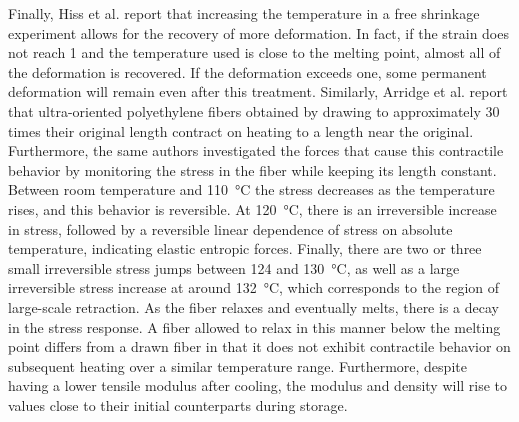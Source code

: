 Finally, Hiss et al. \citep{hissNetworkStretchingSlip1999} report that increasing the temperature in a free shrinkage experiment allows for the recovery of more deformation.
In fact, if the strain does not reach 1 and the temperature used is close to the melting point, almost all of the deformation is recovered.
If the deformation exceeds one, some permanent deformation will remain even after this treatment.
Similarly, Arridge et al. \citep{arridgeSelfhardeningHighlyOriented1977} report that ultra-oriented polyethylene fibers obtained by drawing to approximately 30 times their original length contract on heating to a length near the original.
Furthermore, the same authors investigated the forces that cause this contractile behavior by monitoring the stress in the fiber while keeping its length constant.
Between room temperature and \SI{110}{\celsius} the stress decreases as the temperature rises, and this behavior is reversible.
At \SI{120}{\celsius}, there is an irreversible increase in stress, followed by a reversible linear dependence of stress on absolute temperature, indicating elastic entropic forces.
Finally, there are two or three small irreversible stress jumps between \num{124} and \SI{130}{\celsius}, as well as a large irreversible stress increase at around \SI{132}{\celsius}, which corresponds to the region of large-scale retraction.
As the fiber relaxes and eventually melts, there is a decay in the stress response.
A fiber allowed to relax in this manner below the melting point differs from a drawn fiber in that it does not exhibit contractile behavior on subsequent heating over a similar temperature range.
Furthermore, despite having a lower tensile modulus after cooling, the modulus and density will rise to values close to their initial counterparts during storage.

%

